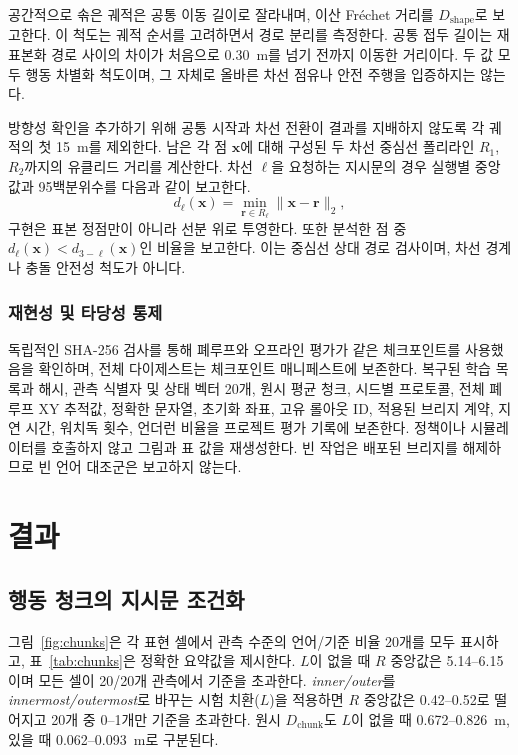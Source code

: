 \documentclass[letterpaper,conference]{IEEEtran}
\newcommand{\dchunk}{D_{\mathrm{chunk}}}
\newcommand{\dshape}{D_{\mathrm{shape}}}
\begin{document}
공간적으로 솎은 궤적은 공통 이동 길이로 잘라내며, 이산 Fr\'{e}chet 거리를
$\dshape$로 보고한다. 이 척도는 궤적 순서를 고려하면서 경로 분리를 측정한다. 공통
접두 길이는 재표본화 경로 사이의 차이가 처음으로 0.30~m를 넘기 전까지 이동한
거리이다. 두 값 모두 행동 차별화 척도이며, 그 자체로 올바른 차선 점유나 안전 주행을
입증하지는 않는다.

방향성 확인을 추가하기 위해 공통 시작과 차선 전환이 결과를 지배하지 않도록 각 궤적의
첫 15~m를 제외한다. 남은 각 점 $\mathbf{x}$에 대해 구성된 두 차선 중심선 폴리라인
$R_1$, $R_2$까지의 유클리드 거리를 계산한다. 차선 $\ell$을 요청하는 지시문의 경우
실행별 중앙값과 95백분위수를 다음과 같이 보고한다.
\begin{equation}
d_\ell(\mathbf{x})=\min_{\mathbf{r}\in R_\ell}
\|\mathbf{x}-\mathbf{r}\|_2,
\label{eq:lane_distance}
\end{equation}
구현은 표본 정점만이 아니라 선분 위로 투영한다. 또한 분석한 점 중
$d_\ell(\mathbf{x})<d_{3-\ell}(\mathbf{x})$인 비율을 보고한다. 이는 중심선 상대 경로
검사이며, 차선 경계나 충돌 안전성 척도가 아니다.

\subsubsection{재현성 및 타당성 통제}
독립적인 SHA-256 검사를 통해 폐루프와 오프라인 평가가 같은 체크포인트를 사용했음을
확인하며, 전체 다이제스트는 체크포인트 매니페스트에 보존한다. 복구된 학습 목록과
해시, 관측 식별자 및 상태 벡터 20개, 원시 평균 청크, 시드별 프로토콜, 전체 폐루프 XY
추적값, 정확한 문자열, 초기화 좌표, 고유 롤아웃 ID, 적용된 브리지 계약, 지연 시간,
워치독 횟수, 언더런 비율을 프로젝트 평가 기록에 보존한다. 정책이나 시뮬레이터를
호출하지 않고 그림과 표 값을 재생성한다. 빈 작업은 배포된 브리지를 해제하므로 빈
언어 대조군은 보고하지 않는다.

\section{결과}
\subsection{행동 청크의 지시문 조건화}
그림~\ref{fig:chunks}은 각 표현 셀에서 관측 수준의 언어/기준 비율 20개를 모두
표시하고, 표~\ref{tab:chunks}은 정확한 요약값을 제시한다. $L$이 없을 때 $R$ 중앙값은
5.14--6.15이며 모든 셀이 20/20개 관측에서 기준을 초과한다. \emph{inner/outer}를
\emph{innermost/outermost}로 바꾸는 시험 치환($L$)을 적용하면 $R$ 중앙값은
0.42--0.52로 떨어지고 20개 중 0--1개만 기준을 초과한다. 원시 $\dchunk$도 $L$이
없을 때 0.672--0.826~m, 있을 때 0.062--0.093~m로 구분된다.
\end{document}
